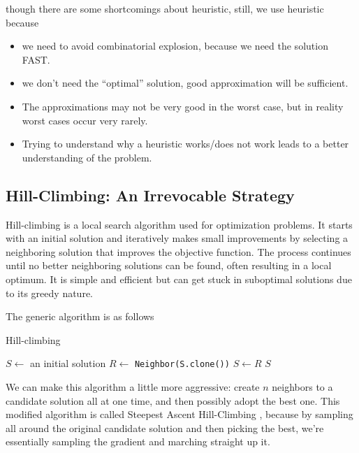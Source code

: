             though there are some shortcomings about heuristic, still, we use heuristic because
            \begin{itemize}
                \item we need to avoid combinatorial explosion, because we need the solution FAST.
                \item we don't need the ``optimal'' solution, good approximation will be sufficient.
                \item The approximations may not be very good in the worst case, but in reality worst cases occur very rarely.
                \item Trying to understand why a heuristic works/does not work leads to a better understanding of the problem.
            \end{itemize}

            \subsection{Hill-Climbing: An Irrevocable Strategy}
                Hill-climbing is a local search algorithm used for optimization problems. It starts with an initial solution and iteratively makes small improvements by selecting a neighboring solution that improves the objective function. The process continues until no better neighboring solutions can be found, often resulting in a local optimum. It is simple and efficient but can get stuck in suboptimal solutions due to its greedy nature.

                The generic algorithm is as follows

                \begin{algorithm}[!htp]
                    \centering
                    \caption{Hill-climbing}
                    \begin{algorithmic}[1]
                        \State $S \gets$ an initial solution
                            \State $R \gets$ \texttt{Neighbor(S.clone())}
                                \State $S \gets R$
                            \EndIf
                        \EndWhile
                        \State \Return $S$
                    \end{algorithmic}
                \end{algorithm}

                We can make this algorithm a little more aggressive: create $n$ neighbors to a candidate solution all at one time, and then possibly adopt the best one. This modified algorithm is called Steepest Ascent Hill-Climbing , because by sampling all around the original candidate solution and then picking the best, we’re essentially sampling the gradient and marching straight up it.

